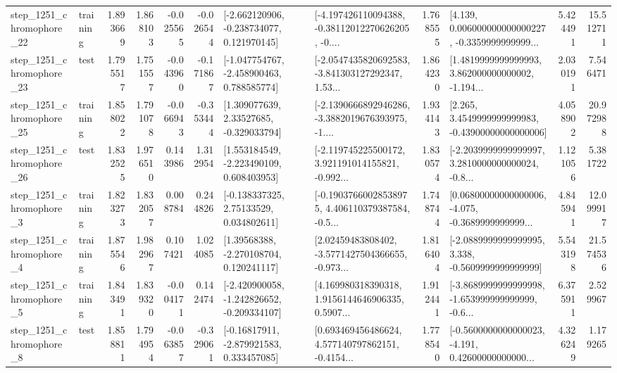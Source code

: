 \begin{tabular}{llrrrrllrlrr}
 step\_1251\_chromophore\_22 &  training &      1.893669 &    1.868103 &     -0.025565 & -0.026544 &   [-2.662120906, -0.238734077, 0.121970145] &  [-4.197426110094388, -0.38112012270626205, -0.... &       1.768555 &  [4.139, 0.006000000000000227, -0.3359999999999... &            5.424491 &         15.512711 \\
 step\_1251\_chromophore\_23 &      test &      1.795517 &    1.751557 &     -0.043960 & -0.171867 &   [-1.047754767, -2.458900463, 0.788585774] &  [-2.0547435820692583, -3.841303127292347, 1.53... &       1.864230 &  [1.4819999999999993, 3.862000000000002, -1.194... &            2.030191 &          7.546471 \\
 step\_1251\_chromophore\_25 &  training &      1.858022 &    1.791078 &     -0.066943 & -0.353444 &     [1.309077639, 2.33527685, -0.329033794] &  [-2.1390666892946286, -3.3882019676393975, -1.... &       1.934143 &  [2.265, 3.4549999999999983, -0.43900000000000006] &            4.058902 &         20.972988 \\
 step\_1251\_chromophore\_26 &      test &      1.832525 &    1.976510 &      0.143986 &  1.312954 &    [1.553184549, -2.223490109, 0.608403953] &  [-2.119745225500172, 3.921191014155821, -0.992... &       1.830574 &  [-2.2039999999999997, 3.2810000000000024, -0.8... &            1.121056 &          5.381722 \\
  step\_1251\_chromophore\_3 &  training &      1.823273 &    1.832057 &      0.008784 &  0.244826 &     [-0.138337325, 2.75133529, 0.034802611] &  [-0.19037660028538975, 4.406110379387584, -0.5... &       1.748744 &  [0.06800000000000006, -4.075, -0.3689999999999... &            4.845941 &         12.099917 \\
  step\_1251\_chromophore\_4 &  training &      1.875546 &    1.982967 &      0.107421 &  1.024085 &     [1.39568388, -2.270108704, 0.120241117] &  [2.02459483808402, -3.5771427504366655, -0.973... &       1.816404 &  [-2.0889999999999995, 3.338, -0.5609999999999999] &            5.543198 &         21.574536 \\
  step\_1251\_chromophore\_5 &  training &      1.843491 &    1.839320 &     -0.004171 &  0.142474 &  [-2.420900058, -1.242826652, -0.209334107] &  [4.169980318390318, 1.9156144646906335, 0.5907... &       1.912441 &  [-3.8689999999999998, -1.653999999999999, -0.6... &            6.375911 &          2.529967 \\
  step\_1251\_chromophore\_8 &      test &      1.858811 &    1.794954 &     -0.063857 & -0.329061 &    [-0.16817911, -2.879921583, 0.333457085] &  [0.693469456486624, 4.577140797862151, -0.4154... &       1.778540 &  [-0.5600000000000023, -4.191, 0.42600000000000... &            4.326249 &          1.179265 \\

\end{tabular}
